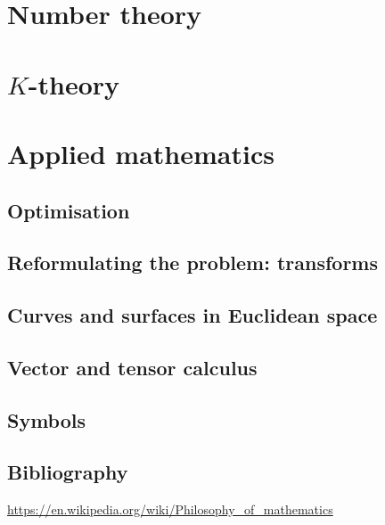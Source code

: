 \documentclass{report}
\begin{document}
\part{Number theory}
\setcounter{chapter}{0} %


\part{$K$-theory}
\setcounter{chapter}{0} %



\part{Applied mathematics}
\setcounter{chapter}{0} %
\chapter{Optimisation}


\chapter{Reformulating the problem: transforms}




\chapter{Curves and surfaces in Euclidean space}

\chapter{Vector and tensor calculus}





\appendix

\chapter{Symbols}


\listoftheorems[title={List of named results}, swapnumber,ignoreall,onlynamed]



\chapter{Bibliography}

\url{https://en.wikipedia.org/wiki/Philosophy_of_mathematics}
\end{document}
